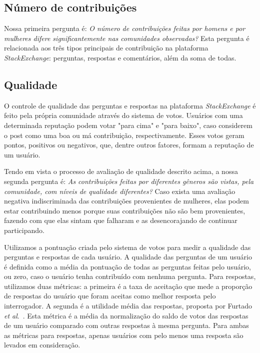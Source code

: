 \subsection{Número de contribuições}

Nossa primeira pergunta é: \textit{O número de contribuições feitas por homens e por mulheres difere significantemente nas comunidades observadas?} Esta pergunta é relacionada aos três tipos principais de contribuição na plataforma \emph{StackExchange}: perguntas, respostas e comentários, além da soma de todas.


\subsection{Qualidade}

O controle de qualidade das perguntas e respostas na plataforma \emph{StackExchange} é feito pela própria comunidade através do sistema de votos. Usuários com uma determinada reputação podem votar "para cima" e "para baixo", caso considerem o post como uma boa ou má contribuição, respectivamente. Esses votos geram pontos, positivos ou negativos, que, dentre outros fatores, formam a reputação de um usuário. 

Tendo em vista o processo de avaliação de qualidade descrito acima, a nossa segunda pergunta é: \textit{As contribuições feitas por diferentes gêneros são vistas, pela comunidade, com níveis de qualidade diferentes?} Caso exista uma avaliação negativa indiscriminada das contribuições provenientes de mulheres, elas podem estar contribuindo menos porque suas contribuições não são bem provenientes, fazendo com que elas sintam que falharam e as desencorajando de continuar participando. 

Utilizamos a pontuação criada pelo sistema de votos para medir a qualidade das perguntas e respostas de cada usuário. A qualidade das perguntas de um usuário é definida como a média da pontuação de todas as perguntas feitas pelo usuário, ou zero, caso o usuário tenha contribuído com nenhuma pergunta. Para respostas, utilizamos duas métricas: a primeira é a taxa de aceitação que mede a proporção de respostas do usuário que foram aceitas como melhor resposta pelo interrogador. A segunda é a utilidade média das respostas, proposta por Furtado \textit{et al}.~\cite{furtado2013contributor}. Esta métrica é a média da normalização do saldo de votos das respostas de um usuário comparado com outras respostas à mesma pergunta. Para ambas as métricas para respostas, apenas usuários com pelo menos uma resposta são levados em consideração.

